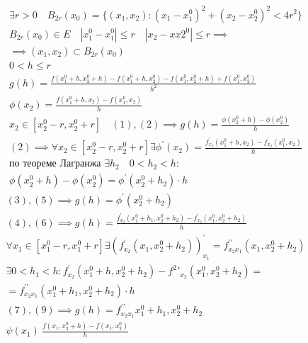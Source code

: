 \documentclass[main]{subfiles}
\begin{document}
        \begin{longProof}
            \begin{gather*}
                \exists r > 0 \quad B_{2r}(x_0) = \{ (x_1,x_2) : (x_1-x_1^0)^2 + (x_2-x_2^0)^2 < 4r^2 \} \\
                B_{2r}(x_0) \in E \quad |x_1^0 - x_1^0| \leq r \quad |x_2-xx2^0| \leq r \implies \\
                \implies (x_1,x_2) \subset B_{2r}(x_0) \\
                0 < h \leq r \\
                g(h) = \frac{f(x_1^0+h,x_2^0+h)-f(x_1^0+h,x_2^0) - f(x_1^0,x_2^0+h) + f(x_1^0,x_2^0)}{h^2} \tag{1}\\
                \phi(x_2) = \frac{f(x_1^0+h,x_2) - f(x_1^0,x_2)}{h} \tag{2}\\
                x_2 \in [x_2^0-r, x_2^0+r]  \quad (1),(2) \implies g(h) = \frac{\phi(x_2^0+h)-\phi(x_2^0)}{h} \tag{3} \\
                (2) \implies \forall x_2 \in [x^0_2 - r, x^0_2 + r] \exists \phi^\prime(x_2) = \frac{f^\prime_{x_2}(x_1^0+h,x_2)-f^\prime_{x_2}(x_1^0,x_2)}{h} \tag{4}\\
                \text{по теореме Лагранжа } \exists h_2 \quad 0 < h_2 < h : \\
                \phi(x_2^0+h) - \phi(x_2^0) = \phi^\prime(x_2^0+h_2) \cdot h \tag{5}
            \end{gather*}
            \begin{gather*}
                (3),(5) \implies g(h) = \phi^\prime(x_2^0 + h_2) \tag{6}\\
                (4),(6) \implies g(h) = \frac{f^\prime_{x_2}(x_1^0+h_1,x_2^0+h_2)-f^\prime_{x_2}(x_1^0,x^0_2 + h_2)}{h} \tag{7}\\
                \forall x_1 \in [x_1^0-r,x_1^0+r] \exists (f^\prime_{x_2}(x_1,x_2^0+h_2))^\prime_{x_1} = f^{\prime\prime}_{x_2x_1}(x_1,x_2^0+h_2) \tag{8}\\
                \exists 0 < h_1 < h : f^\prime_{x_2}(x_1^0+h,x_2^0+h_2) - f^2\prime_{x_2}(x_1^0,x_2^0+h_2) =\\=
                f^{\prime\prime}_{x_2x_1}(x_1^0 + h_1, x_2^0 + h_2) \cdot h \tag{9}\\
                (7),(9) \implies g(h) = f^{\prime\prime}_{x_2x_1}{x_1^0+h_1,x_2^0 + h_2} \tag{10}\\
                \psi(x_1) \ \frac{f(x_1,x_2^0+h)-f(x_1,x_2^0)}{h} \tag{11}
            \end{gather*}

\end{longProof}
\end{document}
